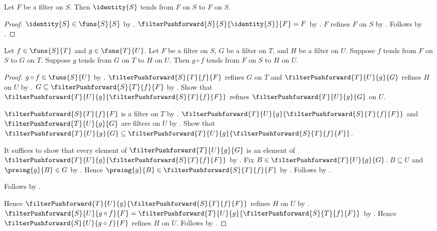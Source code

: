 \begin{proposition}\label{identity_filter_tendsto}
    Let $F$ be a filter on $S$.
    Then $\identity{S}$ tends from $F$ on $S$ to $F$ on $S$.
\end{proposition}
\begin{proof}
    $\identity{S}\in\funs{S}{S}$ by .
    $\filterPushforward{S}{S}{\identity{S}}{F}=F$ by
        .
    $F$ refines $F$ on $S$ by .
    Follows by .
\end{proof}

\begin{theorem}\label{composition_filter_tendsto}
    Let $f\in\funs{S}{T}$ and $g\in\funs{T}{U}$.
    Let $F$ be a filter on $S$, $G$ be a filter on $T$, and
        $H$ be a filter on $U$.
    Suppose $f$ tends from $F$ on $S$ to $G$ on $T$.
    Suppose $g$ tends from $G$ on $T$ to $H$ on $U$.
    Then $g\circ f$ tends from $F$ on $S$ to $H$ on $U$.
\end{theorem}
\begin{proof}
    $g\circ f\in\funs{S}{U}$ by .
    $\filterPushforward{S}{T}{f}{F}$ refines $G$ on $T$ and
        $\filterPushforward{T}{U}{g}{G}$ refines $H$ on $U$ by
        .
    $G\subseteq\filterPushforward{S}{T}{f}{F}$ by
        .
    Show that $\filterPushforward{T}{U}{g}{
            \filterPushforward{S}{T}{f}{F}}$
        refines $\filterPushforward{T}{U}{g}{G}$ on $U$.
    \begin{subproof}
        $\filterPushforward{S}{T}{f}{F}$ is a filter on $T$ by
            .
        $\filterPushforward{T}{U}{g}{
                \filterPushforward{S}{T}{f}{F}}$ and
            $\filterPushforward{T}{U}{g}{G}$ are filters on $U$ by
            .
        Show that $\filterPushforward{T}{U}{g}{G}\subseteq
            \filterPushforward{T}{U}{g}{
                \filterPushforward{S}{T}{f}{F}}$.
        \begin{subproof}
            It suffices to show that every element of
                $\filterPushforward{T}{U}{g}{G}$ is an element of
                $\filterPushforward{T}{U}{g}{
                    \filterPushforward{S}{T}{f}{F}}$ by .
            Fix $B\in\filterPushforward{T}{U}{g}{G}$.
            $B\subseteq U$ and $\preimg{g}{B}\in G$ by
                .
            Hence $\preimg{g}{B}\in
                \filterPushforward{S}{T}{f}{F}$ by .
            Follows by .
        \end{subproof}
        Follows by .
    \end{subproof}
    Hence $\filterPushforward{T}{U}{g}{
            \filterPushforward{S}{T}{f}{F}}$ refines $H$ on $U$ by
        .
    $\filterPushforward{S}{U}{g\circ f}{F}
        =\filterPushforward{T}{U}{g}{
            \filterPushforward{S}{T}{f}{F}}$ by
        .
    Hence $\filterPushforward{S}{U}{g\circ f}{F}$ refines $H$ on $U$.
    Follows by .
\end{proof}

